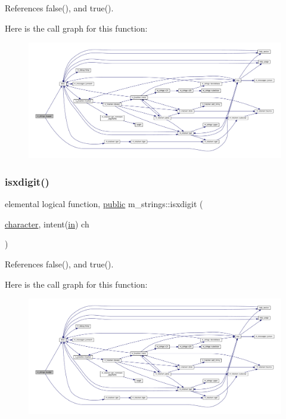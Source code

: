 References false(), and true().

Here is the call graph for this function\+:
\nopagebreak
\begin{figure}[H]
\begin{center}
\leavevmode
\includegraphics[width=350pt]{namespacem__strings_ac98536a1b69026cd5373dfff489f7733_cgraph}
\end{center}
\end{figure}
\mbox{\label{namespacem__strings_a9953d1e400bedceab6a06910c6cdf208}} 
\subsubsection{\texorpdfstring{isxdigit()}{isxdigit()}}
{\footnotesize\ttfamily elemental logical function, \hyperlink{M__stopwatch_83_8txt_a2f74811300c361e53b430611a7d1769f}{public} m\+\_\+strings\+::isxdigit (\begin{DoxyParamCaption}\item[{\hyperlink{option__stopwatch_83_8txt_abd4b21fbbd175834027b5224bfe97e66}{character}, intent(\hyperlink{M__journal_83_8txt_afce72651d1eed785a2132bee863b2f38}{in})}]{ch }\end{DoxyParamCaption})}



References false(), and true().

Here is the call graph for this function\+:
\nopagebreak
\begin{figure}[H]
\begin{center}
\leavevmode
\includegraphics[width=350pt]{namespacem__strings_a9953d1e400bedceab6a06910c6cdf208_cgraph}
\end{center}
\end{figure}
\mbox{\label{namespacem__strings_aa1427d5dd673ff986236ba1732e693c1}} 
